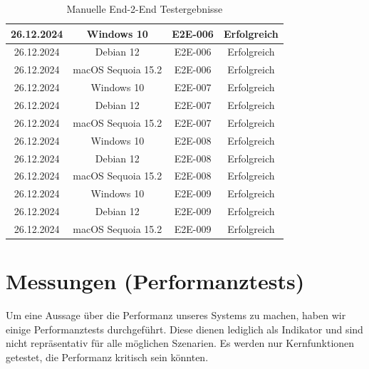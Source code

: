 \documentclass[a4paper,12pt]{report}
\begin{document}
\begin{table}[h!]
\begin{tabular}{|c|c|c|c|}
            26.12.2024     & Windows 10              & E2E-006           & Erfolgreich       \\ \hline
            26.12.2024     & Debian 12               & E2E-006           & Erfolgreich       \\ \hline
            26.12.2024     & macOS Sequoia 15.2      & E2E-006           & Erfolgreich       \\ \hline
            26.12.2024     & Windows 10              & E2E-007           & Erfolgreich       \\ \hline
            26.12.2024     & Debian 12               & E2E-007           & Erfolgreich       \\ \hline
            26.12.2024     & macOS Sequoia 15.2      & E2E-007           & Erfolgreich       \\ \hline
            26.12.2024     & Windows 10              & E2E-008           & Erfolgreich       \\ \hline
            26.12.2024     & Debian 12               & E2E-008           & Erfolgreich       \\ \hline
            26.12.2024     & macOS Sequoia 15.2      & E2E-008           & Erfolgreich       \\ \hline
            26.12.2024     & Windows 10              & E2E-009           & Erfolgreich       \\ \hline
            26.12.2024     & Debian 12               & E2E-009           & Erfolgreich       \\ \hline
            26.12.2024     & macOS Sequoia 15.2      & E2E-009           & Erfolgreich       \\ \hline

        \end{tabular}
        \caption{Manuelle End-2-End Testergebnisse}\label{tab:e2e-results}
    \end{table}


    \clearpage


    \section{Messungen (Performanztests)}\label{sec:performanztests}
    Um eine Aussage über die Performanz unseres Systems zu machen, haben wir einige Performanztests durchgeführt.
    Diese dienen lediglich als Indikator und sind nicht repräsentativ für alle möglichen Szenarien.
    Es werden nur Kernfunktionen getestet, die Performanz kritisch sein könnten.
\end{document}
